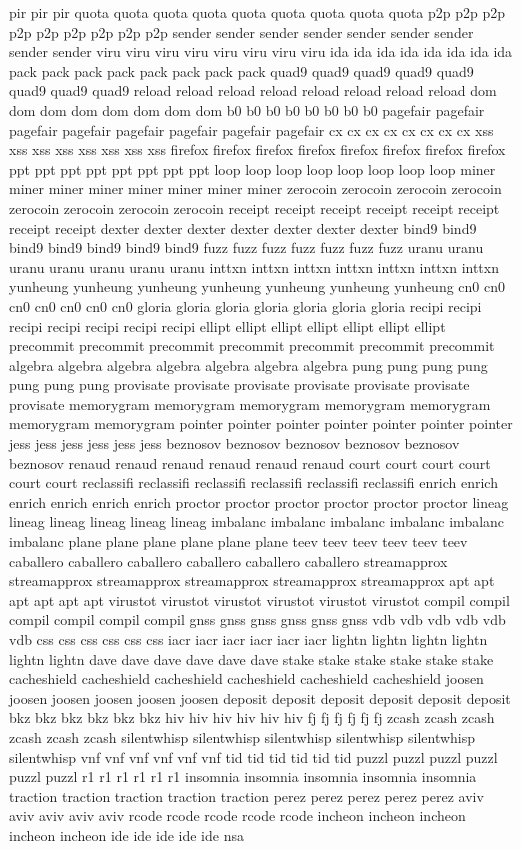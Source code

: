 \documentclass[conference]{IEEEtran}
\begin{document}
pir pir pir quota quota quota quota quota quota quota quota quota p2p p2p p2p p2p p2p p2p p2p p2p p2p sender sender sender sender sender sender sender sender sender viru viru viru viru viru viru viru viru ida ida ida ida ida ida ida ida pack pack pack pack pack pack pack pack quad9 quad9 quad9 quad9 quad9 quad9 quad9 quad9 reload reload reload reload reload reload reload reload dom dom dom dom dom dom dom dom b0 b0 b0 b0 b0 b0 b0 b0 pagefair pagefair pagefair pagefair pagefair pagefair pagefair pagefair cx cx cx cx cx cx cx cx xss xss xss xss xss xss xss xss firefox firefox firefox firefox firefox firefox firefox firefox ppt ppt ppt ppt ppt ppt ppt ppt loop loop loop loop loop loop loop loop miner miner miner miner miner miner miner miner zerocoin zerocoin zerocoin zerocoin zerocoin zerocoin zerocoin zerocoin receipt receipt receipt receipt receipt receipt receipt receipt dexter dexter dexter dexter dexter dexter dexter bind9 bind9 bind9 bind9 bind9 bind9 bind9 fuzz fuzz fuzz fuzz fuzz fuzz fuzz uranu uranu uranu uranu uranu uranu uranu inttxn inttxn inttxn inttxn inttxn inttxn inttxn yunheung yunheung yunheung yunheung yunheung yunheung yunheung cn0 cn0 cn0 cn0 cn0 cn0 cn0 gloria gloria gloria gloria gloria gloria gloria recipi recipi recipi recipi recipi recipi recipi ellipt ellipt ellipt ellipt ellipt ellipt ellipt precommit precommit precommit precommit precommit precommit precommit algebra algebra algebra algebra algebra algebra algebra pung pung pung pung pung pung pung provisate provisate provisate provisate provisate provisate provisate memorygram memorygram memorygram memorygram memorygram memorygram memorygram pointer pointer pointer pointer pointer pointer pointer jess jess jess jess jess jess beznosov beznosov beznosov beznosov beznosov beznosov renaud renaud renaud renaud renaud renaud court court court court court court reclassifi reclassifi reclassifi reclassifi reclassifi reclassifi enrich enrich enrich enrich enrich enrich proctor proctor proctor proctor proctor proctor lineag lineag lineag lineag lineag lineag imbalanc imbalanc imbalanc imbalanc imbalanc imbalanc plane plane plane plane plane plane teev teev teev teev teev teev caballero caballero caballero caballero caballero caballero streamapprox streamapprox streamapprox streamapprox streamapprox streamapprox apt apt apt apt apt apt virustot virustot virustot virustot virustot virustot compil compil compil compil compil compil gnss gnss gnss gnss gnss gnss vdb vdb vdb vdb vdb vdb css css css css css css iacr iacr iacr iacr iacr iacr lightn lightn lightn lightn lightn lightn dave dave dave dave dave dave stake stake stake stake stake stake cacheshield cacheshield cacheshield cacheshield cacheshield cacheshield joosen joosen joosen joosen joosen joosen deposit deposit deposit deposit deposit deposit bkz bkz bkz bkz bkz bkz hiv hiv hiv hiv hiv hiv fj fj fj fj fj fj zcash zcash zcash zcash zcash zcash silentwhisp silentwhisp silentwhisp silentwhisp silentwhisp silentwhisp vnf vnf vnf vnf vnf vnf tid tid tid tid tid tid puzzl puzzl puzzl puzzl puzzl puzzl r1 r1 r1 r1 r1 r1 insomnia insomnia insomnia insomnia insomnia traction traction traction traction traction perez perez perez perez perez aviv aviv aviv aviv aviv rcode rcode rcode rcode rcode incheon incheon incheon incheon incheon ide ide ide ide ide nsa 
\end{document}
